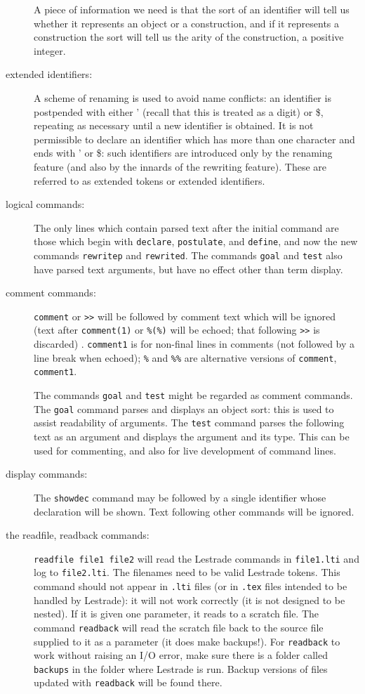 \documentclass[12pt]{article}
\begin{document}
\begin{description}
A piece of information we need is that the sort of an identifier will tell us whether it represents an object or a construction, and if it represents a construction the sort will tell us the arity of the construction, a positive integer.

\item[extended identifiers:]  A scheme of renaming is used to avoid name conflicts:  an identifier is postpended with either ' (recall that this is treated as a digit) or \$, repeating as necessary until a new identifier is obtained.  It is not permissible to declare an identifier which has more than one character and ends with ' or \$:  such identifiers are introduced only by the renaming feature (and also by the innards of the rewriting feature).  These are referred to as extended tokens or extended identifiers.

\item[logical commands:]  The only lines which contain parsed text after the initial command are those which begin with {\tt declare}, {\tt postulate}, and {\tt define}, and now the new commands
{\tt rewritep} and {\tt rewrited}.  The commands {\tt goal} and {\tt test} also have parsed text arguments, but have no effect other than term display.

\item[comment commands:]  {\tt comment} or {\tt >>} will be followed by comment
text which will be ignored (text after {\tt comment(1)} or {\tt \%(\%)} will be echoed; that following {\tt >>} is discarded) .   {\tt comment1} is for non-final lines in comments (not followed by a line break when echoed);
{\tt \%} and {\tt \%\%} are alternative versions of {\tt comment}, {\tt comment1}.

The commands {\tt goal} and {\tt test} might be regarded as comment commands.  The {\tt goal} command parses and displays an object sort:  this is used to assist readability
of arguments.  The {\tt test} command parses the following text as an argument and displays the argument and its type.  This can be used for commenting, and also for live development of command lines.

\item[display commands:]  The {\tt showdec} command may be followed by a single identifier whose declaration will be shown.  Text following other commands will be ignored.

\item[the readfile, readback commands:]  {\tt readfile file1 file2}  will read the Lestrade commands in {\tt file1.lti} and log to {\tt file2.lti}.  The filenames need to be valid Lestrade tokens.  This command should not appear in {\tt .lti} files (or in {\tt .tex} files intended to be handled by Lestrade):  it will not work correctly (it is not designed to be nested).   If it is given one parameter, it reads to a scratch file.  The command {\tt readback} will read the scratch file back to the source file supplied to it as a parameter (it does make backups!).  For {\tt readback} to work without raising an I/O error, make sure there is a folder called {\tt backups} in the folder where Lestrade is run.  Backup versions of files updated with {\tt readback} will be found there.


\end{description}
\end{document}
